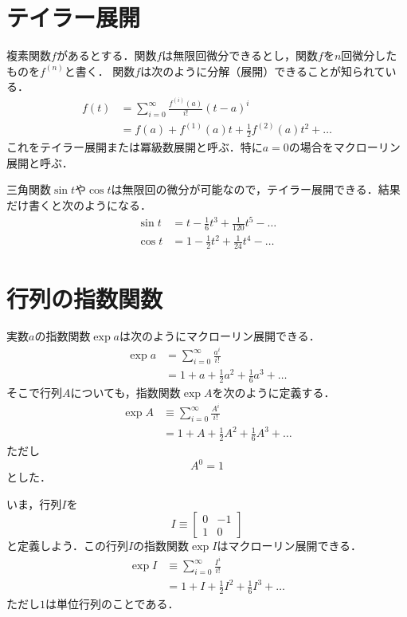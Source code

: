 \documentclass{jsbook}
\begin{document}
\section{テイラー展開}

複素関数$f$があるとする．関数$f$は無限回微分できるとし，関数$f$を$n$回微分したものを$f^{(n)}$と書く．
関数$f$は次のように分解（展開）できることが知られている．
\begin{align}
f(t)&=\sum_{i=0}^\infty\frac{f^{(i)}(a)}{i!}(t-a)^i\\
&=f(a)+f^{(1)}(a)t+\frac{1}{2}f^{(2)}(a)t^2+\dots
\end{align}
これをテイラー展開または冪級数展開と呼ぶ．特に$a=0$の場合をマクローリン展開と呼ぶ．

三角関数$\sin t$や$\cos t$は無限回の微分が可能なので，テイラー展開できる．結果だけ書くと次のようになる．
\begin{align}
\sin t&=t-\frac{1}{6}t^3+\frac{1}{120}t^5-\dots\\
\cos t&=1-\frac{1}{2}t^2+\frac{1}{24}t^4-\dots
\end{align}

\section{行列の指数関数}

実数$a$の指数関数$\exp a$は次のようにマクローリン展開できる．
\begin{align}
\exp a&=\sum_{i=0}^\infty\frac{a^i}{i!}\\
&=1+a+\frac{1}{2}a^2+\frac{1}{6}a^3+\dots
\end{align}
そこで行列$A$についても，指数関数$\exp A$を次のように定義する．
\begin{align}
\exp A&\equiv\sum_{i=0}^\infty\frac{A^i}{i!}\\
&=1+A+\frac{1}{2}A^2+\frac{1}{6}A^3+\dots
\end{align}
ただし
\begin{equation}
A^0=1
\end{equation}
とした．

いま，行列$I$を
\begin{equation}
I\equiv\begin{bmatrix}0&-1\\1&0\end{bmatrix}
\end{equation}
と定義しよう．この行列$I$の指数関数$\exp I$はマクローリン展開できる．
\begin{align}
\exp I&\equiv\sum_{i=0}^\infty\frac{I^i}{i!}\\
&=1+I+\frac{1}{2}I^2+\frac{1}{6}I^3+\dots
\end{align}
ただし$1$は単位行列のことである．
\end{document}
